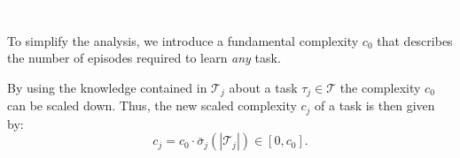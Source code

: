 
\textcolor{white}{nothing}

\begin{tcolorbox}
\begin{assumption}\label{definition:joint_grouping} To simplify the analysis, we introduce a fundamental complexity $c_0$ that describes the number of episodes required to learn \emph{any} task.
\end{assumption}
\end{tcolorbox}
By using the knowledge contained in $\mathcal{T}_j$ about a task $\tau_j \in \mathcal{T}$ the complexity $c_{0}$ can be scaled down. Thus, the new scaled complexity $c_j$ of a task is then given by:
\begin{equation}\label{eq:scaled_complexity}
c_j = c_{0} \cdot \bar{\sigma}_{j}\left(|\mathcal{T}_j|\right)\in [0, c_{0}].
\end{equation}

